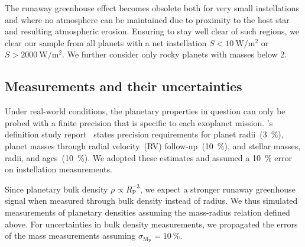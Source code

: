 \documentclass[twocolumn]{aastex631}
\begin{document}
The runaway greenhouse effect becomes obsolete both for very small instellations and where no atmosphere can be maintained due to proximity to the host star and resulting atmospheric erosion.
Ensuring to stay well clear of such regions, we clear our sample from all planets with a net instellation $S < \SI{10}{\watt\per\square\meter}$ or $S > \SI{2000}{\watt\per\square\meter}$.
We further consider only rocky planets with masses below \SI{2}{\Mearth}. %

\subsection{Measurements and their uncertainties}
Under real-world conditions, the planetary properties in question can only be probed with a finite precision that is specific to each exoplanet mission.
\plato's definition study report~\citep{plato2017} states precision requirements for planet radii~(\SI{3}{\percent}), planet masses through radial velocity~(RV) follow-up~(\SI{10}{\percent}), and stellar masses, radii, and ages~(\SI{10}{\percent}).
We adopted these estimates and assumed a \SI{10}{\percent} error on instellation measurements.

Since planetary bulk density $\rho \propto R_\mathrm{P}^{-3}$, we expect a stronger runaway greenhouse signal when measured through bulk density instead of radius.
We thus simulated measurements of planetary densities assuming the mass-radius relation defined above.
For uncertainties in bulk density measurements, we propagated the errors of the mass measurements assuming $\sigma_\mathrm{M_\mathrm{P}} = \SI{10}{\percent}$.
\end{document}
